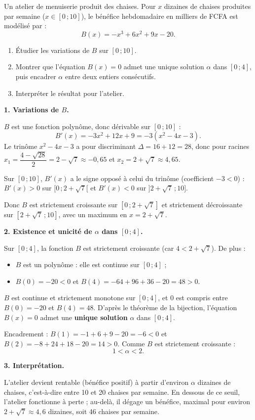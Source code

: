 \documentclass[11pt]{article}
\newcommand{\cle}[1]{{\popxbold\color{popdark}#1}}
\begin{document}
\begin{exoresolu}
Un atelier de menuiserie produit des chaises. Pour $x$ dizaines de chaises produites par semaine ($x\in[0\,;10]$), le bénéfice hebdomadaire en milliers de FCFA est modélisé par :
\[ B(x)=-x^3+6x^2+9x-20. \]
\begin{enumerate}
\item Étudier les variations de $B$ sur $[0\,;10]$.
\item Montrer que l'équation $B(x)=0$ admet une unique solution $\alpha$ dans $[0\,;4]$, puis encadrer $\alpha$ entre deux entiers consécutifs.
\item Interpréter le résultat pour l'atelier.
\end{enumerate}
\tcblower
\textbf{1. Variations de $B$.}

$B$ est une fonction polynôme, donc dérivable sur $[0\,;10]$ :
\[ B'(x)=-3x^2+12x+9=-3(x^2-4x-3). \]
Le trinôme $x^2-4x-3$ a pour discriminant $\Delta=16+12=28$, donc pour racines $x_1=\dfrac{4-\sqrt{28}}{2}=2-\sqrt{7}\approx -0{,}65$ et $x_2=2+\sqrt{7}\approx 4{,}65$.

Sur $[0\,;10]$, $B'(x)$ a le signe opposé à celui du trinôme (coefficient $-3<0$) : $B'(x)>0$ sur $[0\,;2+\sqrt{7}[$ et $B'(x)<0$ sur $]2+\sqrt{7}\,;10]$.

Donc $B$ est \cle{strictement croissante} sur $[0\,;2+\sqrt{7}]$ et strictement décroissante sur $[2+\sqrt{7}\,;10]$, avec un maximum en $x=2+\sqrt{7}$.

\textbf{2. Existence et unicité de $\alpha$ dans $[0\,;4]$.}

Sur $[0\,;4]$, la fonction $B$ est strictement croissante (car $4<2+\sqrt{7}$). De plus :
\begin{itemize}
\item $B$ est un polynôme : elle est \cle{continue} sur $[0\,;4]$ ;
\item $B(0)=-20<0$ et $B(4)=-64+96+36-20=48>0$.
\end{itemize}
$B$ est continue et strictement monotone sur $[0\,;4]$, et $0$ est compris entre $B(0)=-20$ et $B(4)=48$. D'après le \cle{théorème de la bijection}, l'équation $B(x)=0$ admet une \textbf{unique solution} $\alpha$ dans $[0\,;4]$.

Encadrement : $B(1)=-1+6+9-20=-6<0$ et $B(2)=-8+24+18-20=14>0$. Comme $B$ est strictement croissante :
\[ 1<\alpha<2. \]

\textbf{3. Interprétation.}

L'atelier devient rentable (bénéfice positif) à partir d'environ $\alpha$ dizaines de chaises, c'est-à-dire entre 10 et 20 chaises par semaine. En dessous de ce seuil, l'atelier fonctionne à perte ; au-delà, il dégage un bénéfice, maximal pour environ $2+\sqrt{7}\approx 4{,}6$ dizaines, soit 46 chaises par semaine.
\end{exoresolu}
\end{document}
